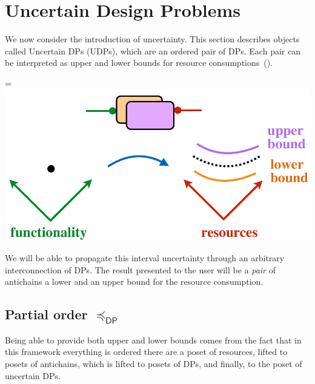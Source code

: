 \documentclass[twocolumn,english]{IEEEconf}
\theoremstyle{plain}
\theoremstyle{definition}
\theoremstyle{definition}
\theoremstyle{plain}
\newcommand{\aword}[1]{\mathsf{#1}}
\newcommand{\vmath}[1]{\aword{#1}}
\newcommand{\posleq}{\preceq}
\newcommand{\dpsp}{\vmath{DP}}
\newcommand{\dpleq}{\posleq_\dpsp}
\newcommand*{\vcenteredhbox}[1]{\begingroup
\setbox0=\hbox{#1}\parbox{\wd0}{\box0}\endgroup}
\newcommand{\captionsideleft}[2]{
    \medskip
    \begin{minipage}{1.8cm}{
        \hfill
        \protect\captionof{figure}{#1}}\end{minipage}
    \begin{minipage}{6.6cm}
    
    \vcenteredhbox{{#2}}
    \hfill
    \end{minipage}
    \medskip
}
\begin{document}
\section{Uncertain Design Problems\label{sec:UDP}}

We now consider the introduction of uncertainty. This section describes
objects called Uncertain DPs (UDPs), which are an ordered pair of
DPs. Each pair can be interpreted as upper and lower bounds for resource
consumptions~().

\captionsideleft{\label{fig:udp-bounds}}{\includegraphics[scale=0.33]{unc_ftorLU}}

We will be able to propagate this interval uncertainty through an
arbitrary interconnection of DPs. The result presented to the user
will be a \emph{pair} of antichains \textemdash{} a lower and an upper
bound for the resource consumption. 

\subsection{Partial order $\dpleq$}

Being able to provide both upper and lower bounds comes from the fact
that in this framework everything is ordered \textendash{} there are
a poset of resources, lifted to posets of antichains, which is lifted
to posets of DPs, and finally, to the poset of uncertain DPs. 
\end{document}
